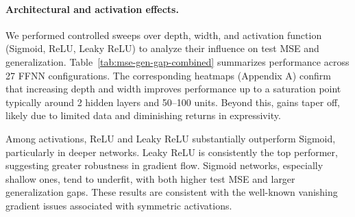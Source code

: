 \documentclass[amssymb,twocolumn,aps]{revtex4}
\begin{document}
\paragraph{Architectural and activation effects.}

We performed controlled sweeps over depth, width, and activation function (Sigmoid, ReLU, Leaky ReLU) to analyze their influence on test MSE and generalization. Table~\ref{tab:mse-gen-gap-combined} summarizes performance across 27 FFNN configurations. The corresponding heatmaps (Appendix A) confirm that increasing depth and width improves performance up to a saturation point typically around 2 hidden layers and 50–100 units. Beyond this, gains taper off, likely due to limited data and diminishing returns in expressivity.

Among activations, ReLU and Leaky ReLU substantially outperform Sigmoid, particularly in deeper networks. Leaky ReLU is consistently the top performer, suggesting greater robustness in gradient flow. Sigmoid networks, especially shallow ones, tend to underfit, with both higher test MSE and larger generalization gaps. These results are consistent with the well-known vanishing gradient issues associated with symmetric activations.
\end{document}
